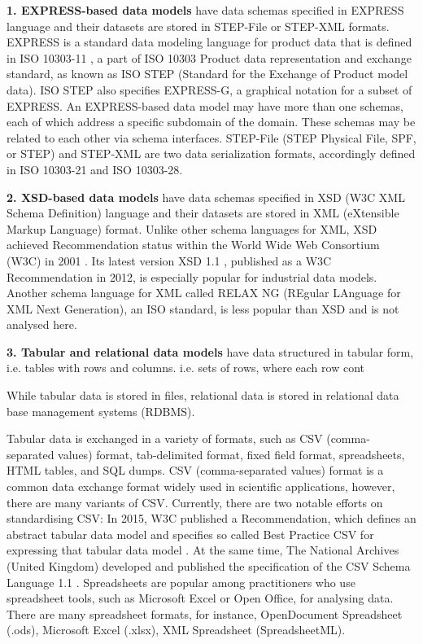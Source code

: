 \textbf{1. EX\-PRESS-ba\-sed da\-ta mod\-els} have data schemas specified in EXPRESS language \cite{iso2004express} and their datasets are stored in STEP-File or STEP-XML formats.
EXPRESS is a standard data modeling language for product data that is defined in ISO 10303-11 \cite{iso2004express}, a part of ISO 10303 Product data representation and exchange standard, as known as ISO STEP (Standard for the Exchange of Product model data).
ISO STEP also specifies EXPRESS-G, a graphical notation for a subset of EXPRESS.
An EXPRESS-based data model may have more than one schemas, each of which address a specific subdomain of the domain.
These schemas may be related to each other via schema interfaces.
STEP-File (STEP Physical File, SPF, or STEP) \cite{iso2016stepfile} and STEP-XML \cite{iso2007stepxml} are two data serialization formats, accordingly defined in ISO 10303-21 and ISO 10303-28.




\textbf{2. XSD-\-ba\-sed da\-ta mod\-els} have data schemas specified in XSD (W3C XML Schema Definition) language and their datasets are stored in XML (eXtensible Markup Language) format.
Unlike other schema languages for XML, XSD achieved Recommendation status within the World Wide Web Consortium (W3C) in 2001 .
Its latest version XSD 1.1 \cite{gao2009w3c, peterson2009w3c}, published as a W3C Recommendation in 2012, is especially popular for industrial data models.
Another schema language for XML called RELAX NG (REgular LAnguage for XML Next Generation), an ISO standard, is less popular than XSD and is not analysed here.




\textbf{3. Tabular and relational data models} have data structured in tabular form, i.e. tables with rows and columns.
i.e. sets of rows, where each row cont


While tabular data is stored in files, relational data is stored in relational data base management systems (RDBMS).

Tabular data is exchanged in a variety of formats, such as CSV (comma-separated values) format, tab-delimited format, fixed field format, spreadsheets, HTML tables, and SQL dumps.
CSV (comma-separated values) format is a common data exchange format widely used in scientific applications, however, there are many variants of CSV.
Currently, there are two notable efforts on standardising CSV:
In 2015, W3C published a Recommendation, which defines an abstract tabular data model and specifies so called Best Practice CSV for expressing that tabular data model \cite{tennison2015tabular}.
At the same time, The National Archives (United Kingdom) developed and published the specification of the CSV Schema Language 1.1 \cite{retter2016csv}.  
Spreadsheets are popular among practitioners who use spreadsheet tools, such as Microsoft Excel or Open Office, for analysing data.
There are many spreadsheet formats, for instance, OpenDocument Spreadsheet (.ods), Microsoft Excel (.xlsx), XML Spreadsheet (SpreadsheetML).


